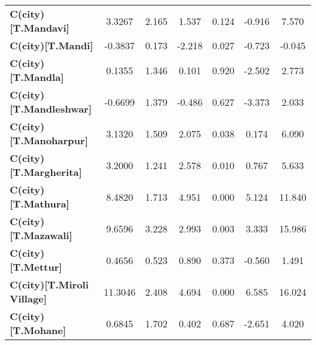 \begin{center}
\begin{tabular}{lcccccc}
\textbf{C(city)[T.Mandavi]}                                                                         &       3.3267  &        2.165     &     1.537  &         0.124        &       -0.916    &        7.570     \\
\textbf{C(city)[T.Mandi]}                                                                           &      -0.3837  &        0.173     &    -2.218  &         0.027        &       -0.723    &       -0.045     \\
\textbf{C(city)[T.Mandla]}                                                                          &       0.1355  &        1.346     &     0.101  &         0.920        &       -2.502    &        2.773     \\
\textbf{C(city)[T.Mandleshwar]}                                                                     &      -0.6699  &        1.379     &    -0.486  &         0.627        &       -3.373    &        2.033     \\
\textbf{C(city)[T.Manoharpur]}                                                                      &       3.1320  &        1.509     &     2.075  &         0.038        &        0.174    &        6.090     \\
\textbf{C(city)[T.Margherita]}                                                                      &       3.2000  &        1.241     &     2.578  &         0.010        &        0.767    &        5.633     \\
\textbf{C(city)[T.Mathura]}                                                                         &       8.4820  &        1.713     &     4.951  &         0.000        &        5.124    &       11.840     \\
\textbf{C(city)[T.Mazawali]}                                                                        &       9.6596  &        3.228     &     2.993  &         0.003        &        3.333    &       15.986     \\
\textbf{C(city)[T.Mettur]}                                                                          &       0.4656  &        0.523     &     0.890  &         0.373        &       -0.560    &        1.491     \\
\textbf{C(city)[T.Miroli Village]}                                                                  &      11.3046  &        2.408     &     4.694  &         0.000        &        6.585    &       16.024     \\
\textbf{C(city)[T.Mohane]}                                                                          &       0.6845  &        1.702     &     0.402  &         0.687        &       -2.651    &        4.020     \\

\end{tabular}
\end{center}
